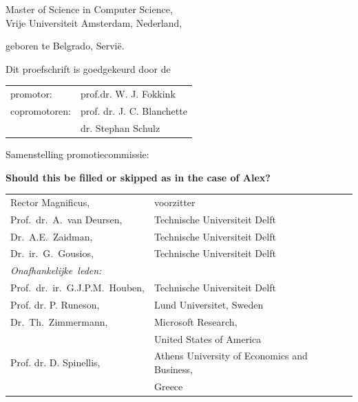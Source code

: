 \begin{titlepage}
\begin{center}
\bigskip
\bigskip

Master of Science in Computer Science, \\
Vrije Universiteit Amsterdam, Nederland,

geboren te Belgrado, Servi\"e.

\vspace*{2\bigskipamount}

\end{center}

\clearpage
\thispagestyle{empty}

\noindent Dit proefschrift is goedgekeurd door de

\medskip\noindent
\begin{tabular}{ll}
    promotor: & prof.dr. W. J. Fokkink \\
    copromotoren: & prof. dr. J. C. Blanchette \\
                  & dr. Stephan Schulz
\end{tabular}

\bigskip
\noindent Samenstelling promotiecommissie:

\textbf{Should this be filled or skipped as in the case of Alex?}

\medskip\noindent
\begin{tabular}{p{4.5cm}l}
    Rector Magnificus, & voorzitter \\
    Prof.\ dr.\ A.\ van Deursen, & Technische Universiteit Delft \\
    Dr.\ A.E.\ Zaidman, & Technische Universiteit Delft \\
    Dr.\ ir.\ G.\ Gousios, & Technische Universiteit Delft \\

    \medskip
    \mbox{\emph{Onafhankelijke leden:}} & \\
    Prof.\ dr.\ ir.\ G.J.P.M.\ Houben, & Technische Universiteit Delft \\
    Prof. dr. P. Runeson, & Lund Universitet, Sweden \\
    Dr.\ Th.\ Zimmermann, & Microsoft Research, \\ &United States of America \\
    Prof. dr. D. Spinellis, & Athens University of Economics and Business, \\&
    Greece \\
    

\end{tabular}
\end{titlepage}
